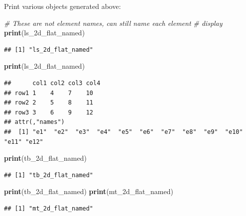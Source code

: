 \documentclass[
]{book}
\newenvironment{Shaded}{\begin{snugshade}}{\end{snugshade}}
\newcommand{\CommentTok}[1]{\textcolor[rgb]{0.56,0.35,0.01}{\textit{#1}}}
\newcommand{\KeywordTok}[1]{\textcolor[rgb]{0.13,0.29,0.53}{\textbf{#1}}}
\newcommand{\NormalTok}[1]{#1}
\newcommand{\StringTok}[1]{\textcolor[rgb]{0.31,0.60,0.02}{#1}}
\begin{document}
Print various objects generated above:

\begin{Shaded}
\begin{Highlighting}[]
\CommentTok{\# These are not element names, can still name each element}
\CommentTok{\# display}
\KeywordTok{print}\NormalTok{(}\StringTok{\textquotesingle{}ls\_2d\_flat\_named\textquotesingle{}}\NormalTok{)}
\end{Highlighting}
\end{Shaded}

\begin{verbatim}
## [1] "ls_2d_flat_named"
\end{verbatim}

\begin{Shaded}
\begin{Highlighting}[]
\KeywordTok{print}\NormalTok{(ls\_2d\_flat\_named)}
\end{Highlighting}
\end{Shaded}

\begin{verbatim}
##      col1 col2 col3 col4
## row1 1    4    7    10  
## row2 2    5    8    11  
## row3 3    6    9    12  
## attr(,"names")
##  [1] "e1"  "e2"  "e3"  "e4"  "e5"  "e6"  "e7"  "e8"  "e9"  "e10" "e11" "e12"
\end{verbatim}

\begin{Shaded}
\begin{Highlighting}[]
\KeywordTok{print}\NormalTok{(}\StringTok{\textquotesingle{}tb\_2d\_flat\_named\textquotesingle{}}\NormalTok{)}
\end{Highlighting}
\end{Shaded}

\begin{verbatim}
## [1] "tb_2d_flat_named"
\end{verbatim}

\begin{Shaded}
\begin{Highlighting}[]
\KeywordTok{print}\NormalTok{(tb\_2d\_flat\_named)}
\KeywordTok{print}\NormalTok{(}\StringTok{\textquotesingle{}mt\_2d\_flat\_named\textquotesingle{}}\NormalTok{)}
\end{Highlighting}
\end{Shaded}

\begin{verbatim}
## [1] "mt_2d_flat_named"
\end{verbatim}
\end{document}
